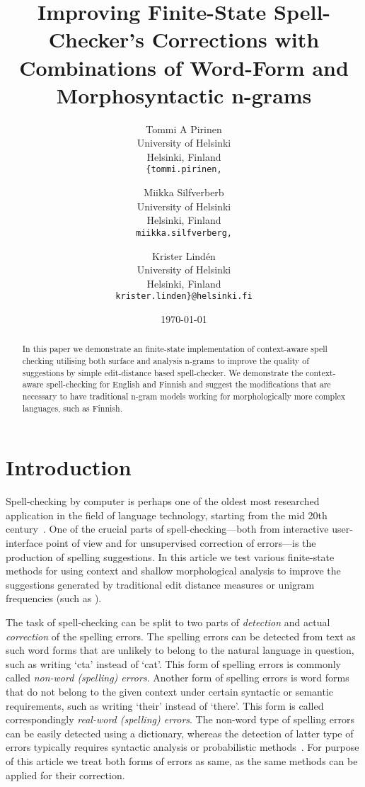 \documentclass[11pt,a4paper]{article}
\title{Improving Finite-State Spell-Checker's Corrections with Combinations of Word-Form and Morphosyntactic n-grams}
\author{Tommi A Pirinen\\
  University of Helsinki\\
  Helsinki, Finland\\
  {\tt \{tommi.pirinen,} \and
  Miikka Silfverberb\\
  University of Helsinki\\
  Helsinki, Finland\\
  {\tt miikka.silfverberg,} \and
  Krister Lind\'{e}n\\
  University of Helsinki\\
  Helsinki, Finland\\
  {\tt krister.linden\}@helsinki.fi}
}
\date{\today}
\begin{document}
\maketitle
\begin{abstract}
  In this paper we demonstrate an finite-state implementation of context-aware
  spell checking utilising both surface and analysis n-grams to improve the
  quality of suggestions by simple edit-distance based spell-checker. We
  demonstrate the context-aware spell-checking for English and Finnish and
  suggest the modifications that are necessary to have traditional n-gram
  models working for morphologically more complex languages, such as Finnish.
\end{abstract}

\section{Introduction}

Spell-checking by computer is perhaps one of the oldest most researched
application in the field of language technology, starting from the mid 20th
century~\cite{damerau/1964}. One of the crucial parts of spell-checking---both
from interactive user-interface point of view and for unsupervised correction
of errors---is the production of spelling suggestions.  In this article we test
various finite-state methods for using context and shallow morphological
analysis to improve the suggestions generated by traditional edit distance
measures or unigram frequencies (such as \cite{pirinen/2010/lrec}).

The task of spell-checking can be split to two parts of \emph{detection} and
actual \emph{correction} of the spelling errors. The spelling errors can be
detected from text as such word forms that are unlikely to belong to the
natural language in question, such as writing `cta' instead of `cat'. This form
of spelling errors is commonly called \emph{non-word (spelling) errors}.
Another form of spelling errors is word forms that do not belong to the given
context under certain syntactic or semantic requirements, such as writing
`their' instead of `there'. This form is called correspondingly \emph{real-word
(spelling) errors}. The non-word type of spelling errors can be easily detected
using a dictionary, whereas the detection of latter type of errors typically
requires syntactic analysis or probabilistic methods~\cite{mitton/2009}. For
purpose of this article we treat both forms of errors as same, as the same
methods can be applied for their correction.
\end{document}
